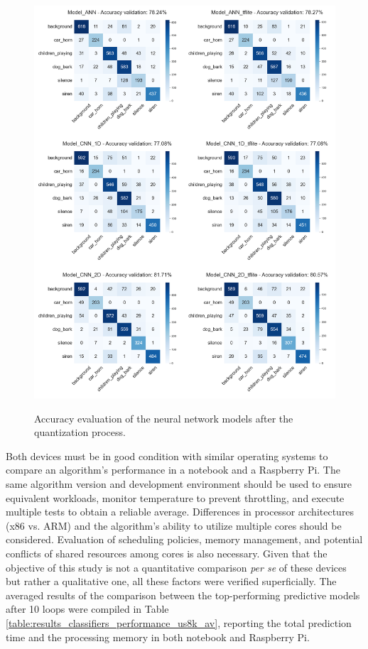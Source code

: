 \begin{figure}[htbp]
    \raggedright
        \caption{Accuracy evaluation of the neural network models after the quantization process.}
        \includegraphics[width=1\textwidth]{resources/images/060-results/Results_classification_overview_models_evaluation_2.png}
        \label{fig:Results_nn_models_evaluation}
\end{figure}

Both devices must be in good condition with similar operating systems to compare an algorithm's performance in a notebook and a Raspberry Pi. The same algorithm version and development environment should be used to ensure equivalent workloads, monitor temperature to prevent throttling, and execute multiple tests to obtain a reliable average. Differences in processor architectures (x86 vs. ARM) and the algorithm's ability to utilize multiple cores should be considered. Evaluation of scheduling policies, memory management, and potential conflicts of shared resources among cores is also necessary. Given that the objective of this study is not a quantitative comparison \textit{per se} of these devices but rather a qualitative one, all these factors were verified superficially. The averaged results of the comparison between the top-performing predictive models after 10 loops were compiled in Table \ref{table:results_classifiers_performance_us8k_av}, reporting the total prediction time and the processing memory in both notebook and Raspberry Pi.

